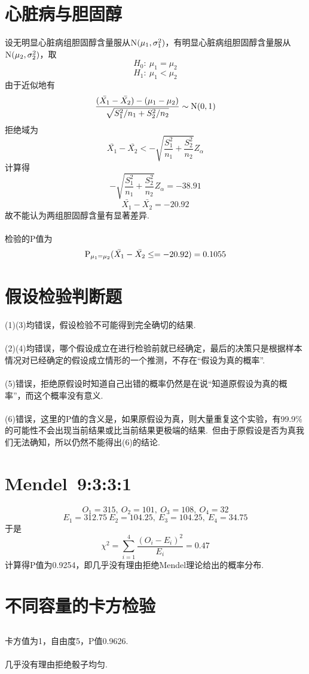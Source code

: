 \documentclass{article}
\begin{document}
\begin{CJK}{UTF8}{gbsn}
\section{心脏病与胆固醇}
设无明显心脏病组胆固醇含量服从${\rm N}(\mu_{1},\sigma_{1}^{2})$，有明显心脏病组胆固醇含量服从${\rm N}(\mu_{2},\sigma_{2}^{2})$，取
$$ H_{0}:\ \mu_{1}=\mu_{2} $$
$$ H_{1}:\ \mu_{1}<\mu_{2} $$
由于近似地有
$$ \frac{(\bar{X_{1}}-\bar{X_{2}})-(\mu_{1}-\mu_{2})}{\sqrt{S_{1}^{2}/n_{1}+S_{2}^{2}/n_{2}}}\sim {\rm N}(0,1)$$
拒绝域为
$$ \bar{X_{1}}-\bar{X_{2}}<-\sqrt{\frac{S_{1}^{2}}{n_{1}}+\frac{S_{2}^{2}}{n_{2}}}Z_{\alpha} $$
计算得
$$ -\sqrt{\frac{S_{1}^{2}}{n_{1}}+\frac{S_{2}^{2}}{n_{2}}}Z_{\alpha}=-38.91 $$
$$ \bar{X_{1}}-\bar{X_{2}}=-20.92 $$
故不能认为两组胆固醇含量有显著差异.
\\\\
检验的P值为
$$ {\rm P}_{\mu_{1}=\mu_{2}}(\bar{X_{1}}-\bar{X_{2}}\leq =-20.92)=0.1055 $$
\section{假设检验判断题}
(1)(3)均错误，假设检验不可能得到完全确切的结果.
\\\\
(2)(4)均错误，哪个假设成立在进行检验前就已经确定，最后的决策只是根据样本情况对已经确定的假设成立情形的一个推测，不存在“假设为真的概率”.
\\\\
(5)错误，拒绝原假设时知道自己出错的概率仍然是在说“知道原假设为真的概率”，而这个概率没有意义.
\\\\
(6)错误，这里的P值的含义是，如果原假设为真，则大量重复这个实验，有99.9\%的可能性不会出现当前结果或比当前结果更极端的结果.\ 但由于原假设是否为真我们无法确知，所以仍然不能得出(6)的结论.
\section{Mendel\ 9:3:3:1}
$$ O_{1}=315,\ O_{2}=101,\ O_{3}=108,\ O_{4}=32 $$
$$ E_{1}=312.75\ E_{2}=104.25,\ E_{3}=104.25,\ E_{4}=34.75$$
于是
$$ \chi^{2}=\sum\limits_{i=1}^{4}\frac{(O_{i}-E_{i})^{2}}{E_{i}}=0.47 $$
计算得P值为0.9254，即几乎没有理由拒绝Mendel理论给出的概率分布.
\section{不同容量的卡方检验}
\subsection{}
卡方值为1，自由度5，P值0.9626.
\\\\
几乎没有理由拒绝骰子均匀.

\end{CJK}
\end{document}
